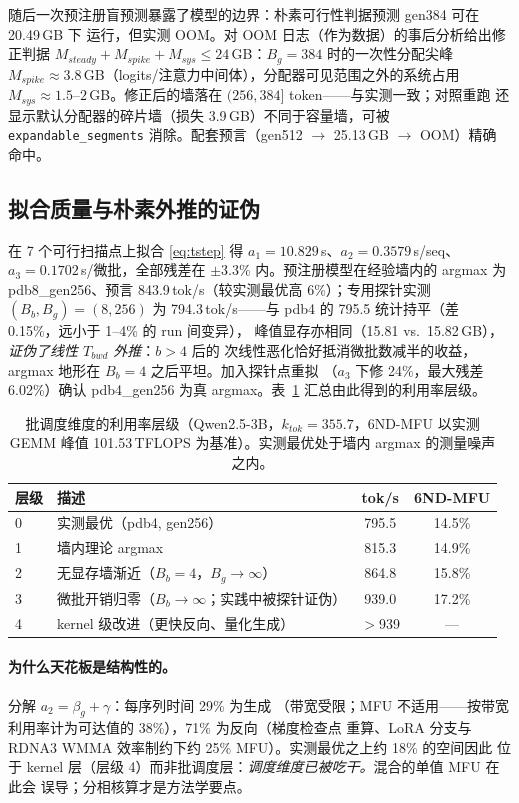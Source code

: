 \documentclass[11pt]{article}
\theoremstyle{definition}
\begin{document}
随后一次预注册盲预测暴露了模型的边界：朴素可行性判据预测 gen384 可在 20.49\,GB 下
运行，但实测 OOM。对 OOM 日志（作为数据）的事后分析给出修正判据
$M_{steady}+M_{spike}+M_{sys}\le24$\,GB：$B_g{=}384$ 时的一次性分配尖峰
$M_{spike}\approx3.8$\,GB（logits/注意力中间体），分配器可见范围之外的系统占用
$M_{sys}\approx1.5$--$2$\,GB。修正后的墙落在 $(256,384]$ token——与实测一致；对照重跑
还显示默认分配器的碎片墙（损失 3.9\,GB）不同于容量墙，可被
\texttt{expandable\_segments} 消除。配套预言（gen512 $\to$ 25.13\,GB $\to$ OOM）精确
命中。

\subsection{拟合质量与朴素外推的证伪}\label{sec:l1-fit}
在 7 个可行扫描点上拟合 \eqref{eq:tstep} 得 $a_1{=}10.829$\,s、$a_2{=}0.3579$\,s/seq、
$a_3{=}0.1702$\,s/微批，全部残差在 $\pm$3.3\% 内。预注册模型在经验墙内的 argmax 为
pdb8\_gen256、预言 843.9\,tok/s（较实测最优高 6\%）；专用探针实测 $(B_b,B_g){=}(8,256)$
为 794.3\,tok/s——与 pdb4 的 795.5 统计持平（差 0.15\%，远小于 1--4\% 的 run 间变异），
峰值显存亦相同（15.81 vs.\ 15.82\,GB），\emph{证伪了线性 $T_{bwd}$ 外推}：$b{>}4$ 后的
次线性恶化恰好抵消微批数减半的收益，argmax 地形在 $B_b{=}4$ 之后平坦。加入探针点重拟
（$a_3$ 下修 24\%，最大残差 6.02\%）确认 pdb4\_gen256 为真 argmax。表~\ref{tab:util}
汇总由此得到的利用率层级。

\begin{table}[t]
\centering\small
\caption{批调度维度的利用率层级（Qwen2.5-3B，$k_{tok}{=}355.7$，6ND-MFU 以实测 GEMM
峰值 101.53\,TFLOPS 为基准）。实测最优处于墙内 argmax 的测量噪声之内。}
\label{tab:util}
\begin{tabular}{@{}llcc@{}}
\toprule
层级 & 描述 & tok/s & 6ND-MFU \\
\midrule
0 & 实测最优（pdb4, gen256） & 795.5 & 14.5\% \\
1 & 墙内理论 argmax & 815.3 & 14.9\% \\
2 & 无显存墙渐近（$B_b{=}4$，$B_g{\to}\infty$） & 864.8 & 15.8\% \\
3 & 微批开销归零（$B_b{\to}\infty$；实践中被探针证伪） & 939.0 & 17.2\% \\
4 & kernel 级改进（更快反向、量化生成） & $>$939 & --- \\
\bottomrule
\end{tabular}
\end{table}

\paragraph{为什么天花板是结构性的。}分解 $a_2=\beta_g+\gamma$：每序列时间 29\% 为生成
（带宽受限；MFU 不适用——按带宽利用率计为可达值的 38\%），71\% 为反向（梯度检查点
重算、LoRA 分支与 RDNA3 WMMA 效率制约下约 25\% MFU）。实测最优之上约 18\% 的空间因此
位于 kernel 层（层级 4）而非批调度层：\emph{调度维度已被吃干。}混合的单值 MFU 在此会
误导；分相核算才是方法学要点。
\end{document}
